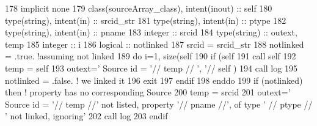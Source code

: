 \begin{DoxyCode}
178     \textcolor{keywordtype}{implicit none}
179     \textcolor{keywordtype}{class}(sourceArray\_class), \textcolor{keywordtype}{intent(inout)} :: self
180     \textcolor{keywordtype}{type}(string), \textcolor{keywordtype}{intent(in)} :: srcid\_str
181     \textcolor{keywordtype}{type}(string), \textcolor{keywordtype}{intent(in)} :: ptype
182     \textcolor{keywordtype}{type}(string), \textcolor{keywordtype}{intent(in)} :: pname
183     \textcolor{keywordtype}{integer} :: srcid
184     \textcolor{keywordtype}{type}(string) :: outext, temp
185     \textcolor{keywordtype}{integer} :: i
186     \textcolor{keywordtype}{logical} :: notlinked
187     srcid = srcid\_str%
188     notlinked = .true.  \textcolor{comment}{!assuming not linked}
189     \textcolor{keywordflow}{do} i=1, \textcolor{keyword}{size}(self%
190         \textcolor{keywordflow}{if} (self%
191             \textcolor{keyword}{call }self%
192             temp = self%
193             outext=\textcolor{stringliteral}{'      Source id = '}// temp // \textcolor{stringliteral}{', '}// self%
      )%
194             \textcolor{keyword}{call }log%
195             notlinked = .false. \textcolor{comment}{! we linked it}
196             \textcolor{keywordflow}{exit}
197 \textcolor{keywordflow}{        endif}
198 \textcolor{keywordflow}{    enddo}
199     \textcolor{keywordflow}{if} (notlinked) \textcolor{keywordflow}{then} \textcolor{comment}{! property has no corresponding Source}
200         temp = srcid
201         outext=\textcolor{stringliteral}{'      Source id = '}// temp //\textcolor{stringliteral}{' not listed, property '}// pname //\textcolor{stringliteral}{', of type '} // ptype // \textcolor{stringliteral}{'
       not linked, ignoring'}
202         \textcolor{keyword}{call }log%
203 \textcolor{keywordflow}{    endif}
\end{DoxyCode}
\mbox{\label{namespacesources__mod_a9c2faf82364c7af60abc1ec25b23c7b5}} 
